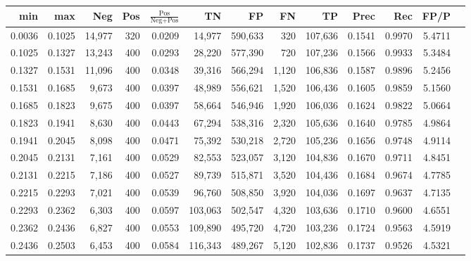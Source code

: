 \begin{tabular}{rrrrrrrrrrrrr}
\toprule
   min &    max &    Neg & Pos & $\frac{\text{Pos}}{\text{Neg}+\text{Pos}}$ &      TN &      FP &      FN &      TP &   Prec &    Rec &   FP/P \\
\midrule
0.0036 & 0.1025 & 14,977 & 320 &                                     0.0209 &  14,977 & 590,633 &     320 & 107,636 & 0.1541 & 0.9970 & 5.4711 \\
0.1025 & 0.1327 & 13,243 & 400 &                                     0.0293 &  28,220 & 577,390 &     720 & 107,236 & 0.1566 & 0.9933 & 5.3484 \\
0.1327 & 0.1531 & 11,096 & 400 &                                     0.0348 &  39,316 & 566,294 &   1,120 & 106,836 & 0.1587 & 0.9896 & 5.2456 \\
0.1531 & 0.1685 &  9,673 & 400 &                                     0.0397 &  48,989 & 556,621 &   1,520 & 106,436 & 0.1605 & 0.9859 & 5.1560 \\
0.1685 & 0.1823 &  9,675 & 400 &                                     0.0397 &  58,664 & 546,946 &   1,920 & 106,036 & 0.1624 & 0.9822 & 5.0664 \\
0.1823 & 0.1941 &  8,630 & 400 &                                     0.0443 &  67,294 & 538,316 &   2,320 & 105,636 & 0.1640 & 0.9785 & 4.9864 \\
0.1941 & 0.2045 &  8,098 & 400 &                                     0.0471 &  75,392 & 530,218 &   2,720 & 105,236 & 0.1656 & 0.9748 & 4.9114 \\
0.2045 & 0.2131 &  7,161 & 400 &                                     0.0529 &  82,553 & 523,057 &   3,120 & 104,836 & 0.1670 & 0.9711 & 4.8451 \\
0.2131 & 0.2215 &  7,186 & 400 &                                     0.0527 &  89,739 & 515,871 &   3,520 & 104,436 & 0.1684 & 0.9674 & 4.7785 \\
0.2215 & 0.2293 &  7,021 & 400 &                                     0.0539 &  96,760 & 508,850 &   3,920 & 104,036 & 0.1697 & 0.9637 & 4.7135 \\
0.2293 & 0.2362 &  6,303 & 400 &                                     0.0597 & 103,063 & 502,547 &   4,320 & 103,636 & 0.1710 & 0.9600 & 4.6551 \\
0.2362 & 0.2436 &  6,827 & 400 &                                     0.0553 & 109,890 & 495,720 &   4,720 & 103,236 & 0.1724 & 0.9563 & 4.5919 \\
0.2436 & 0.2503 &  6,453 & 400 &                                     0.0584 & 116,343 & 489,267 &   5,120 & 102,836 & 0.1737 & 0.9526 & 4.5321 \\

\end{tabular}

